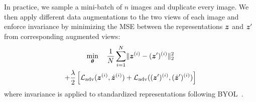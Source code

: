 In practice, we sample a mini-batch of $n$ images and duplicate every image. We then apply different data augmentations to the two views of each image and enforce invariance by minimizing the MSE between the representations ${\bm{z}}$ and ${\bm{z}}^\prime$ from corresponding augmented views: 
\begin{multline} \label{eq:ssl_min_redund_loss}
    \min_{\bm{\theta}} \quad \frac{1}{N} \sum_{i=1}^N \lVert {\bm{z}}^{(i)} - ({\bm{z}}^\prime)^{(i)} \rVert_2^2 \\
    + \frac{\lambda}{2} \left[ \mathcal{L}_{\mathrm{adv}}({\bm{z}}^{(i)}, \hat{{\bm{z}}}^{(i)}) + \mathcal{L}_{\mathrm{adv}}(({\bm{z}}^\prime)^{(i)}, (\hat{{\bm{z}}}^\prime)^{(i)}) \right]
\end{multline}  %
where invariance is applied to standardized representations following BYOL~\citep{grill2020BYOL_ssl}.



